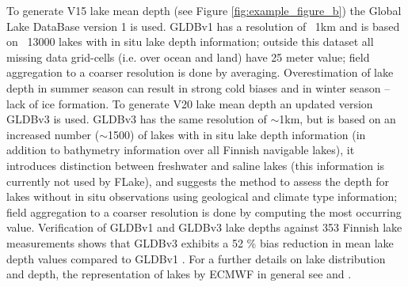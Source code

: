 \documentclass[hess, twostagejnl]{copernicus}
\begin{document}
\noindent To generate V15 lake mean depth (see Figure \ref{fig:example_figure_b}) the Global Lake DataBase version 1 \citep[GLDBv1;][]{Kourzeneva2012} is used. GLDBv1 has a resolution of ~1km and is based on ~13000 lakes with in situ lake depth information; outside this dataset all missing data grid-cells (i.e. over ocean and land) have 25 meter value; field aggregation to a coarser resolution is done by averaging. Overestimation of lake depth in summer season can result in strong cold biases and in winter season – lack of ice formation. To generate V20 lake mean depth an updated version GLDBv3 \citep{Choulga2014} is used. GLDBv3 has the same resolution of $\sim$1km, but is based on an increased number ($\sim$1500) of lakes with in situ lake depth information (in addition to bathymetry information over all Finnish navigable lakes), it introduces distinction between freshwater and saline lakes (this information is currently not used by FLake), and suggests the method to assess the depth for lakes without in situ observations using geological and climate type information; field aggregation to a coarser resolution is done by computing the most occurring value. Verification of GLDBv1 and GLDBv3 lake depths against 353 Finnish lake measurements shows that GLDBv3 exhibits a 52 \% bias reduction in mean lake depth values compared to GLDBv1 \citep{Choulga2019}. For a further details on lake distribution and depth, the representation of lakes by ECMWF in general see \cite{Choulga2019}  and \cite{Boussetta2021}. \newline 
\end{document}
